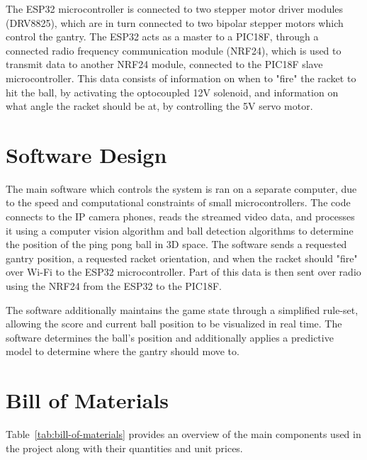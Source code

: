 The ESP32 microcontroller is connected to two stepper motor driver modules (DRV8825), which are in turn connected to two bipolar stepper motors which control the gantry. The ESP32 acts as a master to a PIC18F, through a connected radio frequency communication module (NRF24), which is used to transmit data to another NRF24 module, connected to the PIC18F slave microcontroller. This data consists of information on when to "fire" the racket to hit the ball, by activating the optocoupled 12V solenoid, and information on what angle the racket should be at, by controlling the 5V servo motor.

\section{Software Design}
The main software which controls the system is ran on a separate computer, due to the speed and computational constraints of small microcontrollers. The code connects to the IP camera phones, reads the streamed video data, and processes it using a computer vision algorithm and ball detection algorithms to determine the position of the ping pong ball in 3D space. The software sends a requested gantry position, a requested racket orientation, and when the racket should "fire" over Wi-Fi to the ESP32 microcontroller. Part of this data is then sent over radio using the NRF24 from the ESP32 to the PIC18F.

The software additionally maintains the game state through a simplified rule-set, allowing the score and current ball position to be visualized in real time. The software determines the ball's position and additionally applies a predictive model to determine where the gantry should move to.


\section{Bill of Materials}

Table~\ref{tab:bill-of-materials} provides an overview of the main components used in the project along with their quantities and unit prices.

